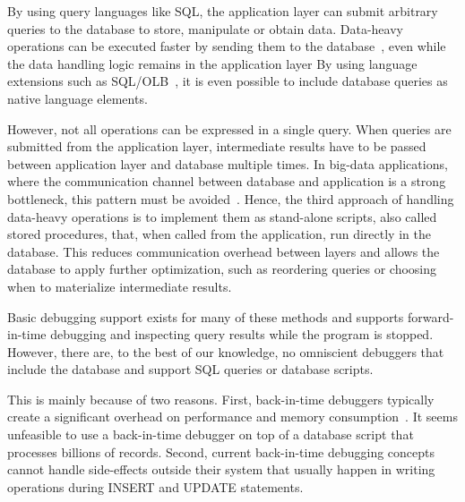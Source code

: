By using query languages like SQL, the application layer can submit arbitrary queries to the database to store, manipulate or obtain data.
Data-heavy operations can be executed faster by sending them to the database~\cite{plattner15:the_in-memory_revolution_how}, even while the data handling logic remains in the application layer
By using language extensions such as SQL/OLB~\cite{eisenberg98:sqlj_part_0_now}, it is even possible to include database queries as native language elements.

However, not all operations can be expressed in a single query.
When queries are submitted from the application layer, intermediate results have to be passed between application layer and database multiple times.
In big-data applications, where the communication channel between database and application is a strong bottleneck, this pattern must be avoided~\cite{plattner15:the_in-memory_revolution_how}.
Hence, the third approach of handling data-heavy operations is to implement them as stand-alone scripts, also called stored procedures, that, when called from the application, run directly in the database.
This reduces communication overhead between layers and allows the database to apply further optimization, such as reordering queries or choosing when to materialize intermediate results.

Basic debugging support exists for many of these methods and supports forward-in-time debugging and inspecting query results while the program is stopped.
However, there are, to the best of our knowledge, no omniscient debuggers that include the database and support SQL queries or database scripts.


\tmpStart
This is mainly because of two reasons. 
First, back-in-time debuggers typically create a significant overhead on performance and memory consumption~\cite{lewis03:debugging_backwards_in_time,pothier07:scalable_omniscient_debugging,lienhard08:practical_object-oriented_back-in-time_debugging}.
It seems unfeasible to use a back-in-time debugger on top of a database script that processes billions of records.
Second, current back-in-time debugging concepts cannot handle side-effects outside their system that usually happen in writing operations during INSERT and UPDATE statements. 

